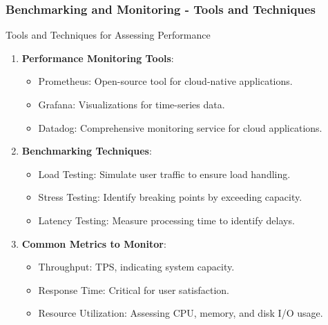 \documentclass{beamer}
\begin{document}
\begin{frame}[fragile]
    \frametitle{Benchmarking and Monitoring - Tools and Techniques}
    \begin{block}{Tools and Techniques for Assessing Performance}
        \begin{enumerate}
            \item \textbf{Performance Monitoring Tools}:
            \begin{itemize}
                \item Prometheus: Open-source tool for cloud-native applications.
                \item Grafana: Visualizations for time-series data.
                \item Datadog: Comprehensive monitoring service for cloud applications.
            \end{itemize}
            
            \item \textbf{Benchmarking Techniques}:
            \begin{itemize}
                \item Load Testing: Simulate user traffic to ensure load handling.
                \item Stress Testing: Identify breaking points by exceeding capacity.
                \item Latency Testing: Measure processing time to identify delays.
            \end{itemize}
            
            \item \textbf{Common Metrics to Monitor}:
            \begin{itemize}
                \item Throughput: TPS, indicating system capacity.
                \item Response Time: Critical for user satisfaction.
                \item Resource Utilization: Assessing CPU, memory, and disk I/O usage.
            \end{itemize}
        \end{enumerate}
    \end{block}
\end{frame}
\end{document}
